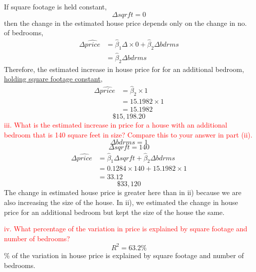 \documentclass[12pt]{report}
\begin{document}
\noindent If square footage is held constant,
$$\Delta sqrft = 0$$
\noindent then the change in the estimated house price depends only on the change in no. of bedrooms,
\begin{align*}
	\Delta\widehat{price} &= \hat{\beta}_1\Delta \times 0 + \hat{\beta}_2\Delta bdrms \\
	&= \hat{\beta}_2\Delta bdrms
\end{align*}
\noindent Therefore, the estimated increase in house price for for an additional bedroom, \uline{holding square footage constant},
\begin{align*}
\Delta\widehat{price} &= \hat{\beta}_2 \times 1 \\
&= 15.1982 \times 1 \\
&= 15.1982
\end{align*}
$$\$15,198.20$$
\noindent \textcolor{red}
{
	iii. What is the estimated increase in price for a house with an additional bedroom that is 140 square feet in size? Compare this to your answer in part (ii).
}
$$\Delta bdrms = 1$$
$$\Delta sqrft = 140$$
\begin{align*}
\Delta\widehat{price} &= \hat{\beta}_1\Delta sqrft + \hat{\beta}_2\Delta bdrms \\
&= 0.1284 \times 140+15.1982 \times 1 \\
&= 33.12
\end{align*}
$$\$33,120$$
\noindent The change in estimated house price is greater here than in ii) because we are also increasing the size of the house. In ii), we estimated the change in house price for an additional bedroom but kept the size of the house the same.

\noindent \textcolor{red}
{
	iv. What percentage of the variation in price is explained by square footage and number of bedrooms?
}
$$R^2 = 63.2\%$$
\% of the variation in house price is explained by square footage and number of bedrooms.
\end{document}
